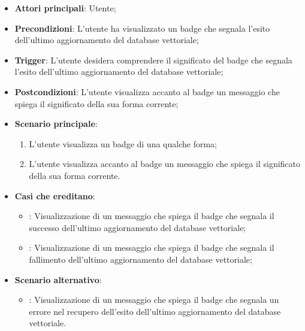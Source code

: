 \begin{itemize}
    \item \textbf{Attori principali}: Utente;
    \item \textbf{Precondizioni}: L'utente ha visualizzato un badge che segnala l'esito dell'ultimo aggiornamento del database vettoriale;
    \item \textbf{Trigger}: L'utente desidera comprendere il significato del badge che segnala l'esito dell'ultimo aggiornamento del database vettoriale;
    \item \textbf{Postcondizioni}: L'utente visualizza accanto al badge un messaggio che spiega il significato della sua forma corrente;
    \item \textbf{Scenario principale}:
    \begin{enumerate}
        \item L'utente visualizza un badge di una qualche forma;
        \item L'utente visualizza accanto al badge un messaggio che spiega il significato della sua forma corrente.
    \end{enumerate}
    \item \textbf{Casi che ereditano}:
    \begin{itemize}
        \item {}: Visualizzazione di un messaggio che spiega il badge che segnala il successo dell'ultimo aggiornamento del database vettoriale;
        \item {}: Visualizzazione di un messaggio che spiega il badge che segnala il fallimento dell'ultimo aggiornamento del database vettoriale;
    \end{itemize}
    \item \textbf{Scenario alternativo}:
    \begin{itemize}
        \item {}: Visualizzazione di un messaggio che spiega il badge che segnala un errore nel recupero dell'esito dell'ultimo aggiornamento del database vettoriale.
    \end{itemize}
\end{itemize}

\hypertarget{UC22}{}
